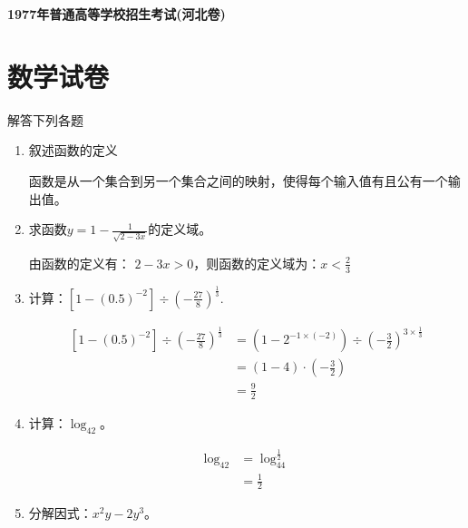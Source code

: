 \documentclass[answers]{exam}
\begin{document}
\begin{center}
	\textbf{1977年普通高等学校招生考试(河北卷)}

	\section*{数学试卷}
\end{center}
\begin{questions}
	\question 解答下列各题
	\begin{enumerate}[label=(\arabic*)]
		\item 叙述函数的定义
		      \begin{solution}
			      函数是从一个集合到另一个集合之间的映射，使得每个输入值有且公有一个输出值。
		      \end{solution}
		\item 求函数$y=1-\frac{1}{\sqrt{2-3x}}$的定义域。
		      \begin{solution}
			      由函数的定义有：
			      \begin{math}
				      2-3x > 0
			      \end{math}，则函数的定义域为：$x<\frac23$
		      \end{solution}
		\item 计算：$\left[1-(0.5)^{-2}\right] \div \left(-\frac{27}{8}\right)^{\frac13}$.
		      \begin{solution}
			      \begin{align*}
				      \left[1-(0.5)^{-2}\right] \div \left(-\frac{27}{8}\right)^{\frac13} & = \left(1-2^{-1\times (-2)}\right)
				      \div \left(-\frac32\right)^{3\times\frac13}                                                              \\
				                                                                          & = (1 - 4) \cdot (-\frac32)         \\
				                                                                          & = \frac92
			      \end{align*}
		      \end{solution}
		\item 计算：$\log_42$。
		      \begin{solution}
			      \begin{align*}
				      \log_42 & = \log_44^\frac12 \\
				              & = \frac12
			      \end{align*}
		      \end{solution}
		\item 分解因式：$x^2y - 2y^3$。

\end{enumerate}
\end{questions}
\end{document}
